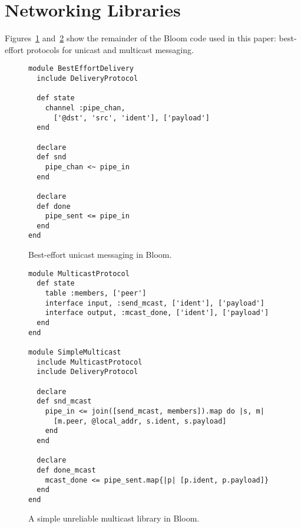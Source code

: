 \section{Networking Libraries}
Figures~\ref{fig:delivery-impl} and~\ref{fig:multicast-impl} show the remainder
of the Bloom code used in this paper: best-effort protocols for unicast and
multicast messaging.

\label{app:network-code}

\begin{figure}[h]
\begin{scriptsize}
\begin{lstlisting}
module BestEffortDelivery
  include DeliveryProtocol

  def state
    channel :pipe_chan,
      ['@dst', 'src', 'ident'], ['payload']
  end

  declare
  def snd
    pipe_chan <~ pipe_in
  end

  declare
  def done
    pipe_sent <= pipe_in
  end
end
\end{lstlisting}
\centering
\vspace{-10pt}
\caption{Best-effort unicast messaging in Bloom.}
\label{fig:delivery-impl}
\end{scriptsize}
\vspace{-2pt}
\end{figure}


\begin{figure}[h]
\begin{scriptsize}
\begin{lstlisting}
module MulticastProtocol
  def state
    table :members, ['peer']
    interface input, :send_mcast, ['ident'], ['payload']
    interface output, :mcast_done, ['ident'], ['payload']
  end
end

module SimpleMulticast
  include MulticastProtocol
  include DeliveryProtocol

  declare
  def snd_mcast
    pipe_in <= join([send_mcast, members]).map do |s, m|
      [m.peer, @local_addr, s.ident, s.payload]
    end
  end

  declare
  def done_mcast
    mcast_done <= pipe_sent.map{|p| [p.ident, p.payload]}
  end
end
\end{lstlisting}
\centering
\vspace{-10pt}
\caption{A simple unreliable multicast library in Bloom.}
\label{fig:multicast-impl}
\end{scriptsize}
\vspace{-2pt}
\end{figure}


